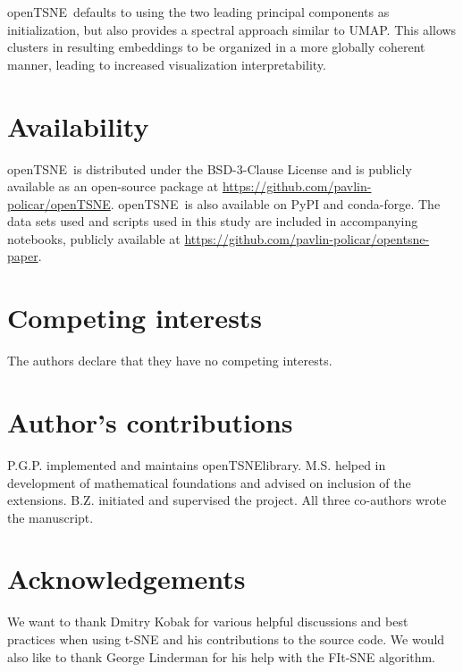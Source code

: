 \documentclass[twocolumn]{article}
\newcommand{\opentsne}{\textsf{openTSNE}}
\begin{document}
\opentsne\ defaults to using the two leading principal components as
initialization, but also provides a spectral approach similar to UMAP.  This
allows clusters in resulting embeddings to be organized in a more globally
coherent manner, leading to increased visualization interpretability.

\section*{Availability}

\opentsne\ is distributed under the BSD-3-Clause License and is publicly
available as an open-source package at
\url{https://github.com/pavlin-policar/openTSNE}. \opentsne\ is also available
on \textsf{PyPI} and \textsf{conda-forge}. The data sets used and scripts used
in this study are included in accompanying notebooks, publicly available at
\url{https://github.com/pavlin-policar/opentsne-paper}.

\section*{Competing interests}
The authors declare that they have no competing interests.

\section*{Author's contributions}
P.G.P. implemented and maintains \opentsne library. M.S. helped in development
of mathematical foundations and advised on inclusion of the extensions.
B.Z. initiated and supervised the project. All three co-authors wrote
the manuscript.

\section*{Acknowledgements}
We want to thank Dmitry Kobak for various helpful discussions and best practices
when using t-SNE and his contributions to the source code. We would also
like to thank George Linderman for his help with the FIt-SNE algorithm.

\end{document}
